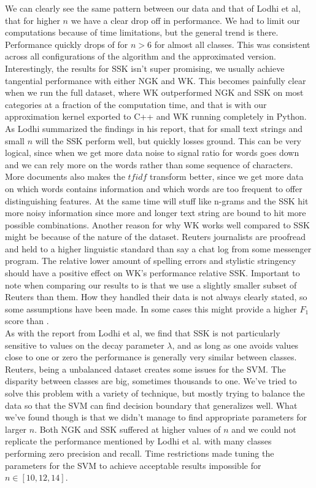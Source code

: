We can clearly see the same pattern between our data and that of Lodhi et al, that for higher $ n $ we have a clear drop off in performance. We had to limit our computations because of time limitations, but the general trend is there. Performance quickly drops of for $ n > 6 $ for almost all classes. This was consistent across all configurations of the algorithm and the approximated version. Interestingly, the results for SSK isn't super promising, we usually achieve tangential performance with either NGK and WK. This becomes painfully clear when we run the full dataset, where WK outperformed NGK and SSK on most categories at a fraction of the computation time, and that is with our approximation kernel exported to C++ and WK running completely in Python. As Lodhi summarized the findings in his report, that for small text strings and small $ n $ will the SSK perform well, but quickly losses ground. This can be very logical, since when we get more data noise to signal ratio for words goes down and we can rely more on the words rather than some sequence of characters. More documents also makes the $ tfidf $ transform better, since we get more data on which words contains information and which words are too frequent to offer distinguishing features. At the same time will stuff like n-grams and the SSK hit more noisy information since more and longer text string are bound to hit more possible combinations. Another reason for why WK works well compared to SSK might be because of the nature of the dataset. Reuters journalists are proofread and held to a higher linguistic standard than say a chat log from some messenger program. The relative lower amount of spelling errors and stylistic stringency should have a positive effect on WK's performance relative SSK. Important to note when comparing our results to \cite{lodhi2002text} is that we use a slightly smaller subset of Reuters than them. How they handled their data is not always clearly stated, so some assumptions have been made. In some cases this might provide a higher $ F_1 $ score than \cite{lodhi2002text}.
\\
As with the report from Lodhi et al, we find that SSK is not particularly sensitive to values on the decay parameter $ \lambda $, and as long as one avoids values close to one or zero the performance is generally very similar between classes. Reuters, being a unbalanced dataset creates some issues for the SVM. The disparity between classes are big, sometimes thousands to one. We've tried to solve this problem with a variety of technique, but mostly trying to balance the data so that the SVM can find decision boundary that generalizes well. What we've found though is that we didn't manage to find appropriate parameters for larger $ n $. Both NGK and SSK suffered at higher values of $ n $ and we could not replicate the performance mentioned by Lodhi et al. with many classes performing zero precision and recall. Time restrictions made tuning the parameters for the SVM to achieve acceptable results impossible for $ n \in [10,12,14] $. 
